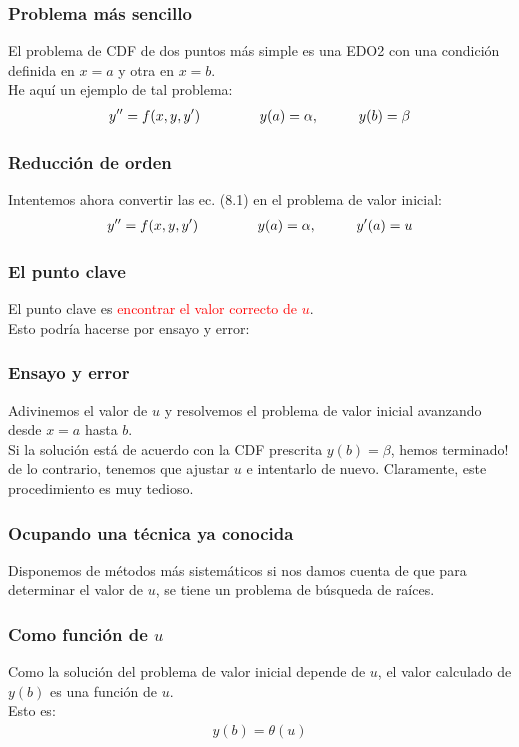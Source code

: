\documentclass[12pt]{beamer}
\begin{document}
\begin{frame}
\frametitle{Problema más sencillo}
El problema de CDF de dos puntos más simple es una EDO2 con una condición definida en $x = a$ y otra en $x = b$.
\\
\bigskip
\pause
He aquí un ejemplo de tal problema:
\begin{align}
{y}^{\prime \prime} = f (x, y, {y}^{\prime}) \hspace{1.5cm} y (a) = \alpha, \hspace{1cm} y (b) = \beta
\label{eq;ecuacion_08_01}
\end{align}
\end{frame}
\begin{frame}
\frametitle{Reducción de orden}
Intentemos ahora convertir las ec. (8.1) en el problema de valor inicial:
\pause
\begin{align}
{y}^{\prime \prime} = f (x, y, {y}^{\prime}) \hspace{1.5cm} y (a) = \alpha, \hspace{1cm} {y}^{\prime} (a) = u
\label{eq;ecuacion_08_02}    
\end{align}
\end{frame}
\begin{frame}
\frametitle{El punto clave}
El punto clave es \textcolor{red}{encontrar el valor correcto de $u$}.
\\
\bigskip
\pause
Esto podría hacerse por ensayo y error:
\end{frame}
\begin{frame}
\frametitle{Ensayo y error}
Adivinemos el valor de $u$ y resolvemos el problema de valor inicial avanzando desde $x = a$ hasta $b$.
\\
\bigskip
\pause
Si la solución está de acuerdo con la CDF prescrita $y (b) = \beta$, hemos terminado! \pause de lo contrario, \pause tenemos que ajustar $u$ e intentarlo de nuevo. \pause Claramente, este procedimiento es muy tedioso.
\end{frame}
\begin{frame}
\frametitle{Ocupando una técnica ya conocida}
Disponemos de métodos más sistemáticos si nos damos cuenta de que para determinar el valor de $u$, \pause se tiene un problema de búsqueda de raíces.
\end{frame}
\begin{frame}
\frametitle{Como función de $u$}
Como la solución del problema de valor inicial depende de $u$, el valor calculado de $y (b)$ es una función de $u$.
\\
\bigskip
\pause
Esto es:
\begin{align*}
y (b) = \theta (u)
\end{align*}
\end{frame}
\end{document}
